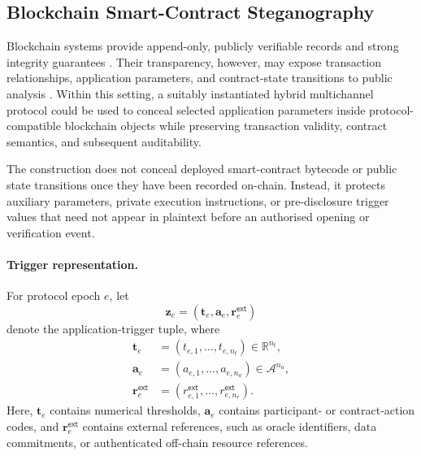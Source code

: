 \documentclass[journal]{IEEEtran}
\theoremstyle{definition}
\theoremstyle{game}
\begin{document}
\subsection{Blockchain Smart-Contract Steganography}
\label{app:blkchain}

Blockchain systems provide append-only, publicly verifiable records
and strong integrity guarantees
\cite{hasselgren2020blockchain,queiroz2020blockchain}. Their
transparency, however, may expose transaction relationships,
application parameters, and contract-state transitions to public
analysis \cite{kshetri2017blockchain,nofer2017blockchain,
irvin2019designing}. Within this setting, a suitably instantiated hybrid multichannel
protocol could be used to conceal selected application parameters
inside protocol-compatible blockchain objects while preserving
transaction validity, contract semantics, and subsequent
auditability.

The construction does not conceal deployed smart-contract bytecode
or public state transitions once they have been recorded on-chain.
Instead, it protects auxiliary parameters, private execution
instructions, or pre-disclosure trigger values that need not appear
in plaintext before an authorised opening or verification event.

\paragraph{Trigger representation.}
For protocol epoch $e$, let
\begin{equation}
\label{eq:blockchain_trigger_vector}
\mathbf{z}_{e}
=
\left(
\mathbf{t}_{e},
\mathbf{a}_{e},
\mathbf{r}^{\mathsf{ext}}_{e}
\right)
\end{equation}
denote the application-trigger tuple, where
\begin{align}
\mathbf{t}_{e}
&=
\left(
t_{e,1},\ldots,t_{e,n_t}
\right)
\in\mathbb{R}^{n_t},
\\
\mathbf{a}_{e}
&=
\left(
a_{e,1},\ldots,a_{e,n_a}
\right)
\in\mathcal{A}^{n_a},
\\
\mathbf{r}^{\mathsf{ext}}_{e}
&=
\left(
r^{\mathsf{ext}}_{e,1},
\ldots,
r^{\mathsf{ext}}_{e,n_r}
\right).
\end{align}
Here, $\mathbf{t}_{e}$ contains numerical thresholds,
$\mathbf{a}_{e}$ contains participant- or contract-action codes,
and $\mathbf{r}^{\mathsf{ext}}_{e}$ contains external references,
such as oracle identifiers, data commitments, or authenticated
off-chain resource references.
\end{document}
